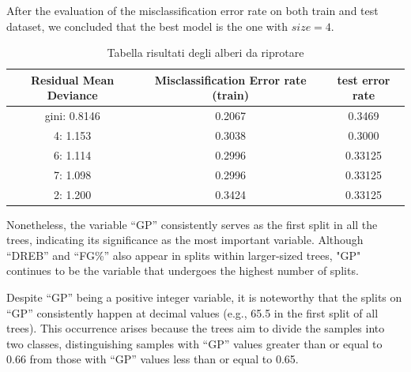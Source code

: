 After the evaluation of the misclassification error rate on both train and test dataset, we concluded that the best model is the one with $size = 4$.

\begin{table}[H]
	\centering
	\begin{tabular}{|| c | c | c ||}
		\hline 
		Residual Mean Deviance & Misclassification Error rate (train) & test error rate	\\
		\hline
		gini: 0.8146 & 0.2067 & 0.3469 \\
		\hline
		4: 1.153 & 0.3038 & 0.3000 \\
		\hline
		6: 1.114 & 0.2996 & 0.33125 \\
		\hline
		7: 1.098 & 0.2996 & 0.33125 \\
		\hline
		2: 1.200 & 0.3424 & 0.33125 \\
		\hline
	\end{tabular}
	\caption{Tabella risultati degli alberi da riprotare}
\end{table} 

Nonetheless, the variable ``GP'' consistently serves as the first split in all the trees, indicating its significance as the most important variable. Although ``DREB'' and ``FG\%'' also appear in splits within larger-sized trees, "GP" continues to be the variable that undergoes the highest number of splits.

Despite ``GP'' being a positive integer variable, it is noteworthy that the splits on ``GP'' consistently happen at decimal values (e.g., 65.5 in the first split of all trees). This occurrence arises because the trees aim to divide the samples into two classes, distinguishing samples with ``GP'' values greater than or equal to 0.66 from those with ``GP'' values less than or equal to 0.65.
